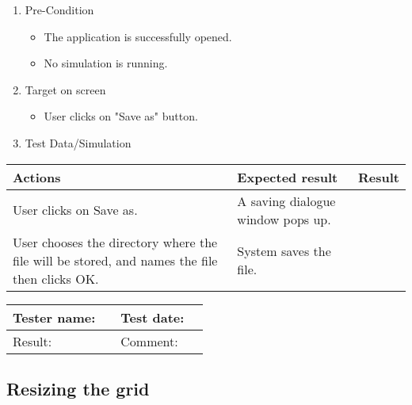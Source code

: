 \begin{enumerate}
	\item Pre-Condition
	\begin{itemize}
		\item The application is successfully opened.
		\item No simulation is running.
	\end{itemize}
	\item Target on screen
	\begin{itemize}
		\item User clicks on "Save as" button.
	\end{itemize}
	\item Test Data/Simulation
\end{enumerate}
	\begin{tabularx}{\textwidth}{|X|X|p{2.5cm}|}\hline
		Actions & Expected result & Result \\\hline
		User clicks on Save as. & A saving dialogue window pops up. & \pass \\\hline
		User chooses the directory where the file will be stored, and names the file then clicks OK. & System saves the file. & \pass \\\hline 
	\end{tabularx}

\begin{tabularx}{\textwidth}{|p{3cm}X|p{3cm}X|}\hline
	Tester name: &  & Test date: & \\\hline
	Result: &  \pass & Comment: & \\\hline
\end{tabularx}

\newpage
\subsection{Resizing the grid}

